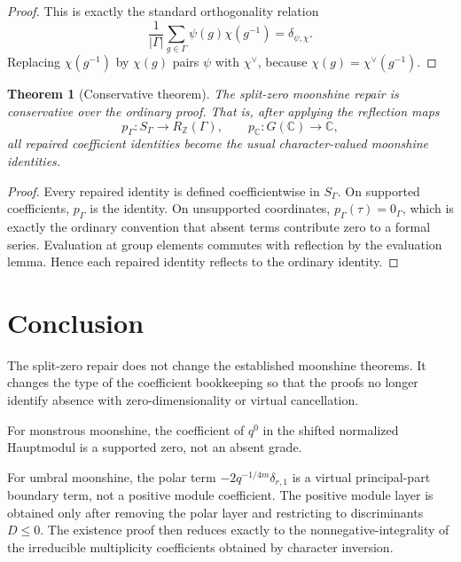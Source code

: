 \documentclass[11pt]{article}
\newtheorem{theorem}{Theorem}[section]
\newcommand{\ZZ}{\mathbb Z}
\newcommand{\CC}{\mathbb C}
\begin{document}
\begin{proof}
This is exactly the standard orthogonality relation
\[
\frac1{|\Gamma|}\sum_{g\in\Gamma}\psi(g)\chi(g^{-1})=\delta_{\psi,\chi}.
\]
Replacing \(\chi(g^{-1})\) by \(\chi(g)\) pairs \(\psi\) with \(\chi^\vee\), because \(\chi(g)=\chi^\vee(g^{-1})\).
\end{proof}

\begin{theorem}[Conservative theorem]
The split-zero moonshine repair is conservative over the ordinary proof.  That is, after applying the reflection maps
\[
p_\Gamma:S_\Gamma\to R_\ZZ(\Gamma),
\qquad
p_\CC:G(\CC)\to\CC,
\]
all repaired coefficient identities become the usual character-valued moonshine identities.
\end{theorem}

\begin{proof}
Every repaired identity is defined coefficientwise in \(S_\Gamma\).  On supported coefficients, \(p_\Gamma\) is the identity.  On unsupported coordinates, \(p_\Gamma(\tau)=0_\Gamma\), which is exactly the ordinary convention that absent terms contribute zero to a formal series.  Evaluation at group elements commutes with reflection by the evaluation lemma.  Hence each repaired identity reflects to the ordinary identity.
\end{proof}

\section{Conclusion}

The split-zero repair does not change the established moonshine theorems.  It changes the type of the coefficient bookkeeping so that the proofs no longer identify absence with zero-dimensionality or virtual cancellation.

For monstrous moonshine, the coefficient of \(q^0\) in the shifted normalized Hauptmodul is a supported zero, not an absent grade.

For umbral moonshine, the polar term \(-2q^{-1/4m}\delta_{r,1}\) is a virtual principal-part boundary term, not a positive module coefficient.  The positive module layer is obtained only after removing the polar layer and restricting to discriminants \(D\le0\).  The existence proof then reduces exactly to the nonnegative-integrality of the irreducible multiplicity coefficients obtained by character inversion.
\end{document}
